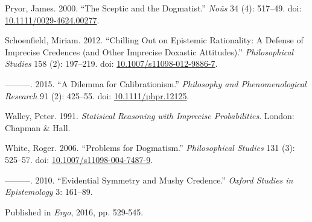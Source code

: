 \documentclass[
  10pt,
  letterpaper,
  DIV=11,
  numbers=noendperiod,
  twoside]{scrartcl}
\newlength{\cslhangindent}
\newenvironment{CSLReferences}[2] %
 {\begin{list}{}{%
  \setlength{\itemindent}{0pt}
  \setlength{\leftmargin}{0pt}
  \setlength{\parsep}{0pt}
  \ifodd #1
   \setlength{\leftmargin}{\cslhangindent}
   \setlength{\itemindent}{-1\cslhangindent}
  \fi
  \setlength{\itemsep}{#2\baselineskip}}}
 {\end{list}}
\begin{document}
\begin{CSLReferences}{1}{0}
Pryor, James. 2000. {``The Sceptic and the Dogmatist.''} \emph{No{û}s}
34 (4): 517--49. doi:
\href{https://doi.org/10.1111/0029-4624.00277}{10.1111/0029-4624.00277}.

Schoenfield, Miriam. 2012. {``Chilling Out on Epistemic Rationality: A
Defense of Imprecise Credences (and Other Imprecise Doxastic
Attitudes).''} \emph{Philosophical Studies} 158 (2): 197--219. doi:
\href{https://doi.org/10.1007/s11098-012-9886-7}{10.1007/s11098-012-9886-7}.

---------. 2015. {``A Dilemma for Calibrationism.''} \emph{Philosophy
and Phenomenological Research} 91 (2): 425--55. doi:
\href{https://doi.org/10.1111/phpr.12125}{10.1111/phpr.12125}.

Walley, Peter. 1991. \emph{Statisical Reasoning with Imprecise
Probabilities}. London: Chapman \& Hall.

White, Roger. 2006. {``Problems for Dogmatism.''} \emph{Philosophical
Studies} 131 (3): 525--57. doi:
\href{https://doi.org/10.1007/s11098-004-7487-9}{10.1007/s11098-004-7487-9}.

---------. 2010. {``Evidential Symmetry and Mushy Credence.''}
\emph{Oxford Studies in Epistemology} 3: 161--89.

\end{CSLReferences}



\noindent Published in\emph{
Ergo}, 2016, pp. 529-545.
\end{document}
